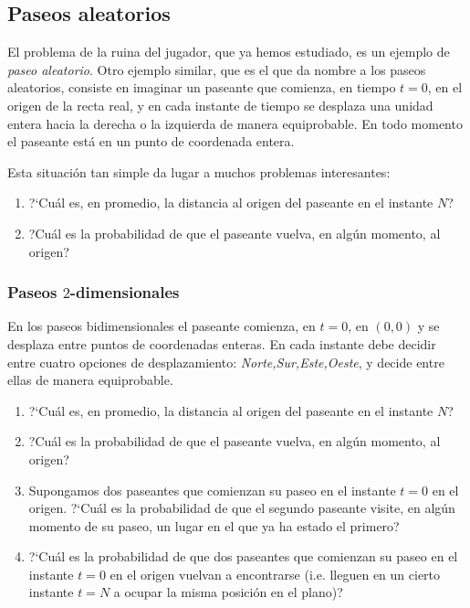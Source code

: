  \subsection{Paseos aleatorios}
El problema de la ruina del jugador, que ya hemos estudiado, es un ejemplo de 
{\itshape paseo aleatorio}. Otro ejemplo similar, que es el que da nombre a los 
paseos aleatorios, consiste en imaginar un paseante que comienza, en tiempo 
$t=0$,  en el origen de la recta real, y en cada instante de tiempo se desplaza 
una unidad entera hacia la derecha o la izquierda de manera equiprobable.  En 
todo momento el paseante est\'a en un punto de coordenada entera.


Esta situaci\'on tan simple da lugar a muchos problemas interesantes:

\begin{ejer}
 
\begin{enumerate}
 \item ?`Cu\'al es, en promedio, la distancia al origen del paseante en el 
instante $N$?
 
 \item ?Cu\'al es la probabilidad de que el paseante vuelva, en alg\'un 
momento, al origen?
 
 \end{enumerate}
\end{ejer}

\subsubsection{Paseos $2$-dimensionales}


En los paseos bidimensionales el paseante comienza, en $t=0$,  en $(0,0)$ y se 
desplaza entre puntos de coordenadas enteras. En cada instante debe decidir 
entre cuatro opciones de desplazamiento: {\itshape Norte,Sur,Este,Oeste}, y 
decide entre ellas de manera equiprobable. 

\begin{ejer}
 
\begin{enumerate}
 \item ?`Cu\'al es, en promedio, la distancia al origen del paseante en el 
instante $N$?
 
 \item ?Cu\'al es la probabilidad de que el paseante vuelva, en alg\'un 
momento, al origen?
 
\item Supongamos dos paseantes que comienzan su paseo en 
el instante $t=0$ en el origen. ?`Cu\'al es la probabilidad de que el segundo 
paseante visite, en alg\'un momento de su paseo,  un lugar en el que ya ha 
estado el primero?
 
 
 \item ?`Cu\'al es la probabilidad de que dos paseantes que comienzan su paseo 
en el instante $t=0$ en el origen vuelvan a encontrarse (i.e. lleguen en un 
cierto instante $t=N$ a ocupar la misma posici\'on en el plano)?


 \end{enumerate}
\end{ejer}

